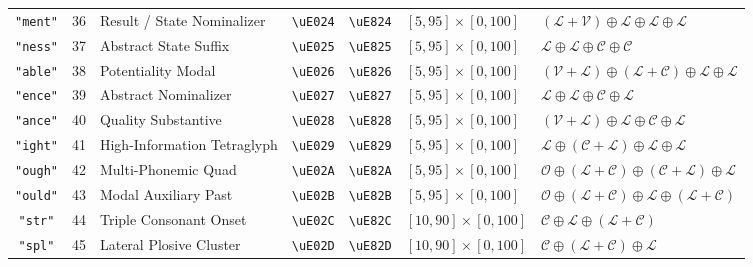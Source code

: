 \documentclass[11pt,oneside,letterpaper]{article}
\theoremstyle{sovereignstyle}
\begin{document}
\begin{table}[b]
\begin{tabularx}{\textwidth}{cc>{\raggedright\arraybackslash}Xcc>{\raggedright\arraybackslash}p{3.2cm}>{\raggedright\arraybackslash}X}
\texttt{"ment"} & 36 & Result / State Nominalizer & \texttt{\textbackslash uE024} & \texttt{\textbackslash uE824} & $[5, 95] \times [0, 100]$  & $(\mathcal{L}+\mathcal{V}) \oplus \mathcal{L} \oplus \mathcal{L} \oplus \mathcal{L}$ \\
\texttt{"ness"} & 37 & Abstract State Suffix      & \texttt{\textbackslash uE025} & \texttt{\textbackslash uE825} & $[5, 95] \times [0, 100]$  & $\mathcal{L} \oplus \mathcal{L} \oplus \mathcal{C} \oplus \mathcal{C}$ \\
\texttt{"able"} & 38 & Potentiality Modal         & \texttt{\textbackslash uE026} & \texttt{\textbackslash uE826} & $[5, 95] \times [0, 100]$  & $(\mathcal{V}+\mathcal{L}) \oplus (\mathcal{L}+\mathcal{C}) \oplus \mathcal{L} \oplus \mathcal{L}$ \\
\texttt{"ence"} & 39 & Abstract Nominalizer       & \texttt{\textbackslash uE027} & \texttt{\textbackslash uE827} & $[5, 95] \times [0, 100]$  & $\mathcal{L} \oplus \mathcal{L} \oplus \mathcal{C} \oplus \mathcal{L}$ \\
\texttt{"ance"} & 40 & Quality Substantive        & \texttt{\textbackslash uE028} & \texttt{\textbackslash uE828} & $[5, 95] \times [0, 100]$  & $(\mathcal{V}+\mathcal{L}) \oplus \mathcal{L} \oplus \mathcal{C} \oplus \mathcal{L}$ \\
\texttt{"ight"} & 41 & High-Information Tetraglyph& \texttt{\textbackslash uE029} & \texttt{\textbackslash uE829} & $[5, 95] \times [0, 100]$  & $\mathcal{L} \oplus (\mathcal{C}+\mathcal{L}) \oplus \mathcal{L} \oplus \mathcal{L}$ \\
\texttt{"ough"} & 42 & Multi-Phonemic Quad        & \texttt{\textbackslash uE02A} & \texttt{\textbackslash uE82A} & $[5, 95] \times [0, 100]$  & $\mathcal{O} \oplus (\mathcal{L}+\mathcal{C}) \oplus (\mathcal{C}+\mathcal{L}) \oplus \mathcal{L}$ \\
\texttt{"ould"} & 43 & Modal Auxiliary Past       & \texttt{\textbackslash uE02B} & \texttt{\textbackslash uE82B} & $[5, 95] \times [0, 100]$  & $\mathcal{O} \oplus (\mathcal{L}+\mathcal{C}) \oplus \mathcal{L} \oplus (\mathcal{L}+\mathcal{C})$ \\
\texttt{"str"}  & 44 & Triple Consonant Onset     & \texttt{\textbackslash uE02C} & \texttt{\textbackslash uE82C} & $[10, 90] \times [0, 100]$ & $\mathcal{C} \oplus \mathcal{L} \oplus (\mathcal{L}+\mathcal{C})$ \\
\texttt{"spl"}  & 45 & Lateral Plosive Cluster    & \texttt{\textbackslash uE02D} & \texttt{\textbackslash uE82D} & $[10, 90] \times [0, 100]$ & $\mathcal{C} \oplus (\mathcal{L}+\mathcal{C}) \oplus \mathcal{L}$ \\

\end{tabularx}
\end{table}
\end{document}
